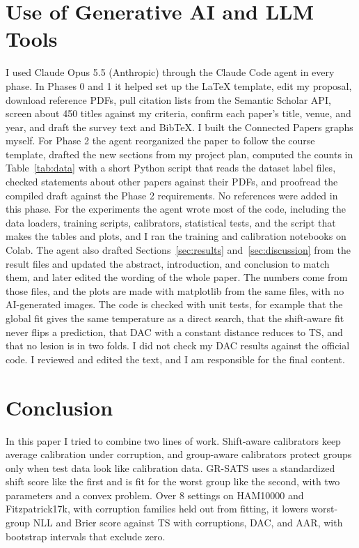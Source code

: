 \documentclass[sigconf,nonacm]{acmart}
\begin{document}
\section{Use of Generative AI and LLM Tools}
\label{sec:llm}

I used Claude Opus 5.5 (Anthropic) through the Claude Code agent in every phase. In Phases 0 and 1 it helped set up the LaTeX template, edit my proposal, download reference PDFs, pull citation lists from the Semantic Scholar API, screen about 450 titles against my criteria, confirm each paper's title, venue, and year, and draft the survey text and BibTeX. I built the Connected Papers graphs myself. For Phase 2 the agent reorganized the paper to follow the course template, drafted the new sections from my project plan, computed the counts in Table~\ref{tab:data} with a short Python script that reads the dataset label files, checked statements about other papers against their PDFs, and proofread the compiled draft against the Phase 2 requirements. No references were added in this phase. For the experiments the agent wrote most of the code, including the data loaders, training scripts, calibrators, statistical tests, and the script that makes the tables and plots, and I ran the training and calibration notebooks on Colab. The agent also drafted Sections~\ref{sec:results} and~\ref{sec:discussion} from the result files and updated the abstract, introduction, and conclusion to match them, and later edited the wording of the whole paper. The numbers come from those files, and the plots are made with matplotlib from the same files, with no AI-generated images. The code is checked with unit tests, for example that the global fit gives the same temperature as a direct search, that the shift-aware fit never flips a prediction, that DAC with a constant distance reduces to TS, and that no lesion is in two folds. I did not check my DAC results against the official code. I reviewed and edited the text, and I am responsible for the final content.

\section{Conclusion}

In this paper I tried to combine two lines of work. Shift-aware calibrators keep average calibration under corruption, and group-aware calibrators protect groups only when test data look like calibration data. GR-SATS uses a standardized shift score like the first and is fit for the worst group like the second, with two parameters and a convex problem. Over 8 settings on HAM10000 and Fitzpatrick17k, with corruption families held out from fitting, it lowers worst-group NLL and Brier score against TS with corruptions, DAC, and AAR, with bootstrap intervals that exclude zero.
\end{document}
